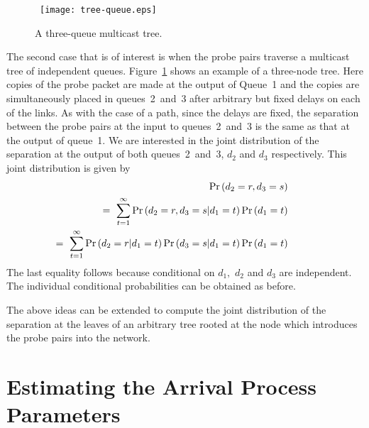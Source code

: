 \documentclass[11pt]{article}
\newcommand{\prob}[1]{\mathsf{\Pr}\left(#1\right)}
\begin{document}
\begin{figure}
  \begin{center}
    \ 
    \texttt{[image: tree-queue.eps]}
  \end{center}
    \caption{A three-queue multicast tree.}
    \label{fig:queue-tree}
\end{figure}


The second case that is of interest is when the probe pairs traverse a
multicast tree of independent queues. Figure~\ref{fig:queue-tree}
shows an example of a three-node tree. Here copies of the probe packet
are made at the output of Queue~1 and the copies are simultaneously
placed in queues~2~and~3 after arbitrary but fixed delays on each of
the links. As with the case of a path, since the delays are fixed, the
separation between the probe pairs at the input to queues~2~and~3 is
the same as that at the output of queue~1. We are interested in the
joint distribution of the separation at the output of both
queues~2~and~3, $d_2$ and $d_3$ respectively. This joint distribution
is given by
\begin{eqnarray}
  && \hspace{-30pt} \prob{d_2=r, d_3=s} \nonumber  \\
  && \hspace{-30pt} \ = \ \sum_{t=1}^\infty \prob{d_2=r, d_3=s | d_1=t}
  \prob{d_1=t} \nonumber \\
  && \hspace{-40pt} \ = \ \sum_{t=1}^\infty  \prob{d_2=r|d_1=t}
  \prob{d_3=s|d_1=t} \prob{d_1=t} 
  \label{eq:multicast-joint-distbn}
\end{eqnarray}
The last equality follows because conditional on $d_1,$ $d_2$ and
$d_3$ are independent.  The individual conditional probabilities can
be obtained as before.

The above ideas can be extended to compute the joint distribution of
the separation at the leaves of an arbitrary tree rooted at the node
which introduces the probe pairs into the network.

\section{Estimating the Arrival Process Parameters}
\label{sec:estimating-A_n}
\end{document}
